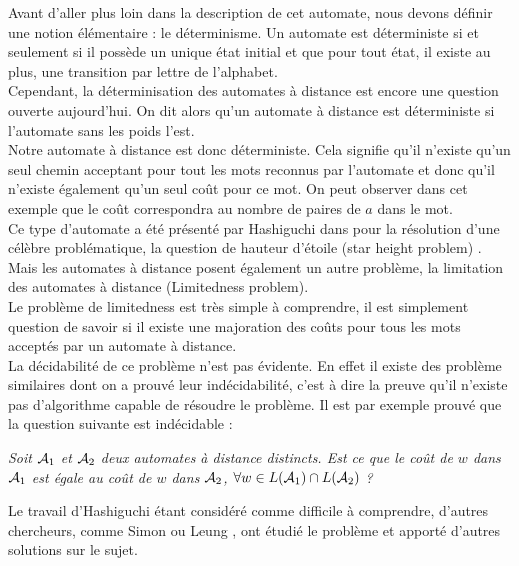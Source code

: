 \documentclass{report}
\begin{document}
Avant d'aller plus loin dans la description de cet automate, nous devons définir une notion élémentaire : le déterminisme. Un automate est déterministe si et seulement si il possède un unique état initial et que pour tout état, il existe au plus, une transition par lettre de l'alphabet.\\
Cependant, la déterminisation des automates à distance est encore une question ouverte aujourd'hui. On dit alors qu'un automate à distance est déterministe si l’automate sans les poids l'est.\\

Notre automate à distance est donc déterministe. Cela signifie qu'il n'existe qu'un seul chemin acceptant pour tout les mots reconnus par l'automate et donc qu'il n'existe également qu'un seul coût pour ce mot. On peut observer dans cet exemple que le coût correspondra au nombre de paires de $a$ dans le mot. \\

Ce type d'automate a été présenté par Hashiguchi dans \cite{Hashiguchi:Limitedness-theorem-on-finite-automata-with-distance-functions:1982:a} pour la résolution d'une célèbre problématique, la question de hauteur d'étoile (star height problem) \cite{Eggan:Transition-graphs-and-the-star-height-of-regular-events:1963:a}. Mais les automates à distance posent également un autre problème, la limitation des automates à distance (Limitedness problem).\\
Le problème de limitedness est très simple à comprendre, il est simplement question de savoir si il existe une majoration des coûts pour tous les mots acceptés par un automate à distance.\\
La décidabilité de ce problème n'est pas évidente. En effet il existe des problème similaires dont on a prouvé leur indécidabilité, c'est à dire la preuve qu'il n'existe pas d'algorithme capable de résoudre le problème. Il est par exemple prouvé que la question suivante est indécidable :
\begin{center}
\textit{Soit $\mathcal{A}_{1}$ et $\mathcal{A}_{2}$ deux automates à distance distincts. Est ce que le coût de $w$ dans $\mathcal{A}_{1}$ est égale au coût de $w$ dans $\mathcal{A}_{2}$, $\forall w \in L(\mathcal{A}_{1}) \cap L(\mathcal{A}_{2})$ ?}
\end{center}
Le travail d'Hashiguchi étant considéré comme difficile à comprendre, d'autres chercheurs, comme Simon \cite{Simon:Semigroups-Matrices-over-Tropical:1994:a} ou Leung \cite{Leung&Podolskiy:limitedness-problem-distance-automata::2004:a}, ont étudié le problème et apporté d'autres solutions sur le sujet.\\
\end{document}
